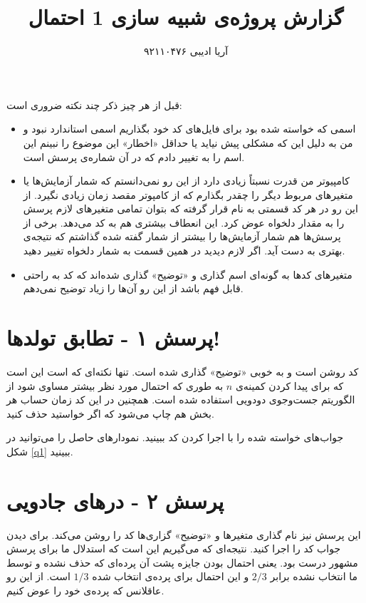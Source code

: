 \documentclass[11pt]{article}
\title{گزارش پروژه‌ی شبیه سازی 1 احتمال}
\author{آریا ادیبی ۹۲۱۱۰۴۷۶}
\date{}
\theoremstyle{definition}
\theoremstyle{lemma}
\theoremstyle{remark}
\begin{document}
	\maketitle
	
	 قبل از هر چیز ذکر چند نکته ضروری است:
	 \begin{itemize}
	 	\item
	 	اسمی که خواسته شده بود برای فایل‌های کد خود بگذاریم اسمی استاندارد نبود و من به دلیل
	 	این که مشکلی پیش نیاید یا حداقل «اخطار» این موضوع را نبینم این اسم را به
	 	تغییر دادم که در آن
	 	شماره‌ی پرسش است.
	 	
	 	\item
	 	کامپیوتر من قدرت نسبتاً زیادی دارد از این رو نمی‌دانستم که شمار آزمایش‌ها یا متغیر‌های 
	 	مربوط دیگر را چقدر بگذارم که از کامپوتر مقصد زمان زیادی نگیرد. از این رو در هر کد 
	 	قسمتی به نام
	 	قرار گرفته که بتوان تمامی متغیر‌های لازم پرسش را به مقدار دلخواه عوض کرد. این انعطاف
	 	بیشتری هم به کد می‌دهد. برخی از پرسش‌ها هم شمار آزمایش‌ها را بیشتر از شمار گفته شده
	 	گذاشتم که نتیجه‌ی بهتری به دست آید. اگر لازم دیدید در همین قسمت به شمار دلخواه تغییر دهید.
	 	
	 	\item
	 	متغیر‌های کد‌ها به گونه‌ای اسم گذاری و «توضیح» گذاری شده‌اند که کد به راحتی قابل فهم باشد
	 	از این رو آن‌ها را زیاد توضیح نمی‌دهم.
	 \end{itemize}
 	
 	\section{پرسش ۱ - تطابق تولد‌ها!}
 	کد روشن است و به خوبی «توضیح» گذاری شده است. تنها نکته‌ای که است این است که برای پیدا کردن
 	کمینه‌ی 
 	$n$
 	به طوری که احتمال مورد نظر بیشتر مساوی 
 	شود از الگوریتم جست‌وجوی دودویی استفاده شده است.
 	همچنین در این کد زمان حساب هر بخش هم چاپ می‌شود که اگر خواستید حذف کنید.
 	
 	جواب‌های خواسته شده را با اجرا کردن کد ببینید. 
 	نمودار‌های حاصل را می‌توانید در
 	\textcolor{darkishBlue}{شکل}
 	\ref{q1}
 	ببینید.
	\section{پرسش ۲ - در‌های جادویی}
	این پرسش نیز نام گذاری متغیر‌ها و «توضیح» گزاری‌ها کد را روشن می‌کند. برای دیدن جواب
	کد را اجرا کنید.
	نتیجه‌ای که می‌گیریم این است که استدلال ما برای پرسش مشهور
	درست بود. یعنی احتمال بودن جایزه پشت آن پرده‌ای که حذف نشده و توسط ما انتخاب نشده 
	برابر 
	$2/3$
	و این احتمال برای پرده‌ی انتخاب شده 
	$1/3$
	است. از این رو عاقلانس که پرده‌ی خود را عوض کنیم.
\end{document}
